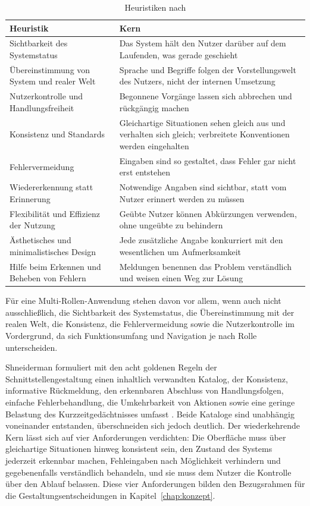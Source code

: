 \begin{table}[htbp]
\centering
\caption{Heuristiken nach \cite{nielsen_explanatory_power}}
\label{tab:heuristiken}
\small
\begin{tabular}{|p{4.2cm}|p{8.3cm}|}
\hline
\textbf{Heuristik} & \textbf{Kern} \\
\hline
Sichtbarkeit des System\-status & Das System hält den Nutzer
darüber auf dem Laufenden, was gerade geschieht \\
\hline
Übereinstimmung von System und realer Welt & Sprache und Begriffe
folgen der Vorstellungswelt des Nutzers, nicht der internen
Umsetzung \\
\hline
Nutzerkontrolle und Handlungs\-freiheit & Begonnene Vorgänge
lassen sich abbrechen und rückgängig machen \\
\hline
Konsistenz und Standards & Gleichartige Situationen sehen gleich
aus und verhalten sich gleich; verbreitete Konventionen werden
eingehalten \\
\hline
Fehler\-vermeidung & Eingaben sind so gestaltet, dass Fehler gar
nicht erst entstehen \\
\hline
Wieder\-erkennung statt Erinnerung & Notwendige Angaben sind
sichtbar, statt vom Nutzer erinnert werden zu müssen \\
\hline
Flexibilität und Effizienz der Nutzung & Geübte Nutzer können
Abkürzungen verwenden, ohne ungeübte zu behindern \\
\hline
Ästhetisches und minimalistisches Design & Jede zusätzliche
Angabe konkurriert mit den wesentlichen um Aufmerksamkeit \\
\hline
Hilfe beim Erkennen und Beheben von Fehlern & Meldungen benennen
das Problem verständlich und weisen einen Weg zur Lösung \\
\hline
\end{tabular}
\end{table}

Für eine Multi-Rollen-Anwendung stehen davon vor allem, wenn auch
nicht ausschließlich, die Sichtbarkeit des Systemstatus, die
Übereinstimmung mit der realen Welt, die Konsistenz, die
Fehlervermeidung sowie die Nutzerkontrolle im Vordergrund, da sich
Funktionsumfang und Navigation je nach Rolle unterscheiden.
 
Shneiderman formuliert mit den acht goldenen Regeln der
Schnittstellengestaltung einen inhaltlich verwandten Katalog, der
Konsistenz, informative Rückmeldung, den erkennbaren Abschluss von
Handlungsfolgen, einfache Fehlerbehandlung, die Umkehrbarkeit von
Aktionen sowie eine geringe Belastung des Kurzzeitgedächtnisses
umfasst \cite{shneiderman_ui}. Beide Kataloge sind unabhängig
voneinander entstanden, überschneiden sich jedoch deutlich. Der
wiederkehrende Kern lässt sich auf vier Anforderungen verdichten:
Die Oberfläche muss über gleichartige Situationen hinweg
konsistent sein, den Zustand des Systems jederzeit erkennbar
machen, Fehleingaben nach Möglichkeit verhindern und
gegebenenfalls verständlich behandeln, und sie muss dem Nutzer die
Kontrolle über den Ablauf belassen. Diese vier Anforderungen
bilden den Bezugsrahmen für die Gestaltungsentscheidungen in
Kapitel~\ref{chap:konzept}.

